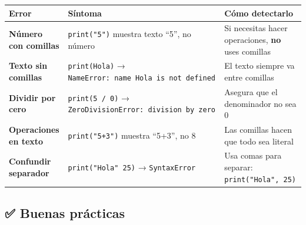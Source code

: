 \documentclass[
  doc,
  floatsintext,
  longtable,
  a4paper,
  nolmodern,
  notxfonts,
  notimes,
  12pt,
  colorlinks=true,linkcolor=blue,citecolor=blue,urlcolor=blue]{apa7}
\newcounter{none} %
\begin{document}
{\def\LTcaptype{none} %
\begin{longtable}[]{@{}
  >{\raggedright\arraybackslash}p{}
  >{\raggedright\arraybackslash}p{}
  >{\raggedright\arraybackslash}p{}@{}}
\toprule\noalign{}
\begin{minipage}[b]{\linewidth}\raggedright
Error
\end{minipage} & \begin{minipage}[b]{\linewidth}\raggedright
Síntoma
\end{minipage} & \begin{minipage}[b]{\linewidth}\raggedright
Cómo detectarlo
\end{minipage} \\
\midrule\noalign{}
\endhead
\bottomrule\noalign{}
\endlastfoot
\textbf{Número con comillas} & \texttt{print("5")} muestra texto ``5'',
no número & Si necesitas hacer operaciones, \textbf{no} uses comillas \\
\textbf{Texto sin comillas} & \texttt{print(Hola)} →
\texttt{NameError:\ name\ \textquotesingle{}Hola\textquotesingle{}\ is\ not\ defined}
& El texto siempre va entre comillas \\
\textbf{Dividir por cero} & \texttt{print(5\ /\ 0)} →
\texttt{ZeroDivisionError:\ division\ by\ zero} & Asegura que el
denominador no sea 0 \\
\textbf{Operaciones en texto} & \texttt{print("5+3")} muestra ``5+3'',
no 8 & Las comillas hacen que todo sea literal \\
\textbf{Confundir separador} & \texttt{print("Hola"\ 25)} →
\texttt{SyntaxError} & Usa comas para separar:
\texttt{print("Hola",\ 25)} \\
\end{longtable}
}

\subsection{✅ Buenas prácticas}\label{buenas-pruxe1cticas}
\end{document}
